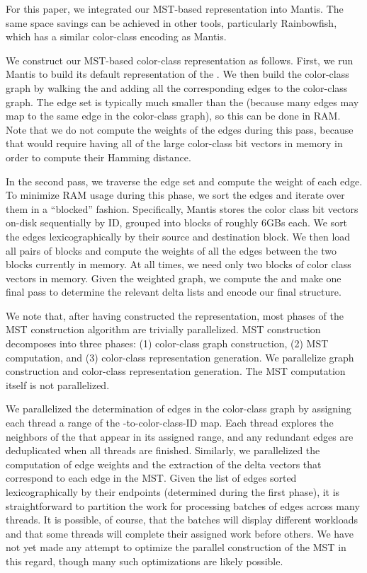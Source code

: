 For this paper, we integrated our MST-based representation into
Mantis.  The same space savings can be achieved in
other tools, particularly Rainbowfish, which has
a similar color-class encoding as Mantis.

We construct our MST-based color-class representation as follows.
First, we run Mantis to build its default representation of the \cdbg.
We then build the color-class graph by walking the \dbg and adding all
the corresponding edges to the color-class graph.  The edge set is
typically much smaller than the \dbg (because many \dbg edges may map to
the same edge in the color-class graph), so this can be done in RAM.
Note that we do not compute the weights of the edges during this pass,
because that would require having all of the large color-class bit vectors
in memory in order to compute their Hamming distance.

In the second pass, we traverse the edge set and compute the weight of
each edge.  To minimize RAM usage during this phase, we sort
the edges and iterate over them in a ``blocked'' fashion.
Specifically, Mantis stores the color class bit vectors on-disk
sequentially by ID, grouped into blocks of roughly 6GBs each.  We sort
the edges lexicographically by their source and destination block. We then load
all pairs of blocks and compute the weights of all the edges between the two
blocks currently in memory. At all times, we need only two blocks of color class
vectors in memory. Given the weighted graph, we compute the \mst and make one
final pass to determine the relevant delta lists and encode our final \mst
structure.

  We note that, after having
constructed the \prevsys representation, most phases of the MST
construction algorithm are trivially parallelized.  MST construction
decomposes into three phases: (1) color-class graph construction, (2)
MST computation, and (3) color-class representation generation.
We parallelize graph construction and color-class representation
generation. The MST computation itself is not parallelized.

We parallelized the determination of edges in the color-class graph by
assigning each thread a range of the \kmer-to-color-class-ID
map. Each thread explores the neighbors of the \kmers that appear in
its assigned range, and any redundant edges are deduplicated when all
threads are finished.  Similarly, we parallelized the computation of
edge weights and the extraction of the delta vectors that correspond
to each edge in the MST. Given the list of edges sorted
lexicographically by their endpoints (determined during the first
phase), it is straightforward to partition the work for processing
batches of edges across many threads. It is possible, of course, that
the batches will display different workloads and that some threads
will complete their assigned work before others.  We have not yet made
any attempt to optimize the parallel construction of the MST in this
regard, though many such optimizations are likely possible.

